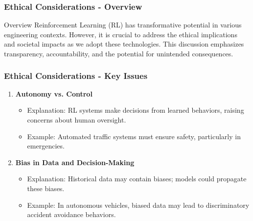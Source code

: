\documentclass[aspectratio=169]{beamer}
\begin{document}
\begin{frame}[fragile]
    \frametitle{Ethical Considerations - Overview}
    \begin{block}{Overview}
        Reinforcement Learning (RL) has transformative potential in various engineering contexts. 
        However, it is crucial to address the ethical implications and societal impacts as we adopt these technologies. 
        This discussion emphasizes transparency, accountability, and the potential for unintended consequences.
    \end{block}
\end{frame}

\begin{frame}[fragile]
    \frametitle{Ethical Considerations - Key Issues}
    \begin{enumerate}
        \item \textbf{Autonomy vs. Control}
            \begin{itemize}
                \item Explanation: RL systems make decisions from learned behaviors, raising concerns about human oversight.
                \item Example: Automated traffic systems must ensure safety, particularly in emergencies.
            \end{itemize}
        
        \item \textbf{Bias in Data and Decision-Making}
            \begin{itemize}
                \item Explanation: Historical data may contain biases; models could propagate these biases.
                \item Example: In autonomous vehicles, biased data may lead to discriminatory accident avoidance behaviors.
            \end{itemize}
    \end{enumerate}
\end{frame}
\end{document}
